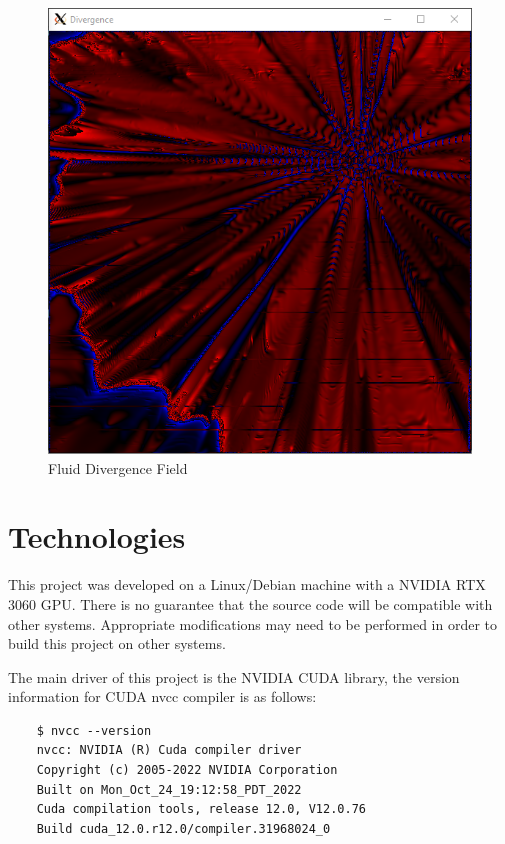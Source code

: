 \documentclass[
10pt, %
letterpaper, %
oneside, %
headinclude,footinclude, %
BCOR5mm, %
]{scrartcl}
\begin{document}
\begin{figure}[h]
    \centering
    \includegraphics[scale=0.5]{../png/divergence_example.PNG}
    \caption{Fluid Divergence Field}
\end{figure}

\pagebreak
\section{Technologies} %
This project was developed on a Linux/Debian machine with a NVIDIA RTX 3060 GPU. There is no guarantee that the source code will be compatible
with other systems. Appropriate modifications may need to be performed in order to build this project on other systems.

The main driver of this project is the NVIDIA CUDA library, the version information for CUDA nvcc compiler is as follows:
\begin{verbatim}
    $ nvcc --version
    nvcc: NVIDIA (R) Cuda compiler driver
    Copyright (c) 2005-2022 NVIDIA Corporation
    Built on Mon_Oct_24_19:12:58_PDT_2022
    Cuda compilation tools, release 12.0, V12.0.76
    Build cuda_12.0.r12.0/compiler.31968024_0
\end{verbatim}
\end{document}
